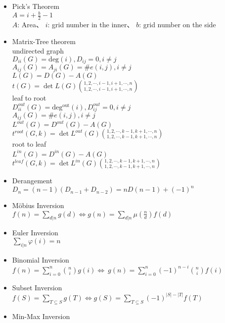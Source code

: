 \begin{itemize}
\setlength\itemsep{0.3em}

  \item Pick’s Theorem\\
    $A = i + \frac{b}{2} - 1$\\
    $A$: Area、 $i$: grid number in the inner、 $b$: grid number on the side
  \item Matrix-Tree theorem\\
    undirected graph\\
    $D_{ii}(G) = \mathrm{deg}(i), D_{ij} = 0, i\neq j$\\  
    $A_{ij}(G)=A_{ji}(G)=\#e(i,j), i\neq j$\\
    $L(G) = D(G) - A(G)$\\
    $t(G) = \det L(G){1,2,\cdots,i-1,i+1,\cdots,n \choose 1,2,\cdots,i-1,i+1,\cdots,n}$\\
    leaf to root\\
    $D^{out}_{ii}(G) = \mathrm{deg^{out}}(i), D^{out}_{ij} = 0, i\neq j$\\
    $A_{ij}(G)=\#e(i,j), i\neq j$\\
    $L^{out}(G) = D^{out}(G) - A(G)$\\
    $t^{root}(G, k) = \det L^{out}(G){1,2,\cdots,k-1,k+1,\cdots,n \choose 1,2,\cdots,k-1,k+1,\cdots,n}$\\
    root to leaf\\
    $L^{in}(G) = D^{in}(G) - A(G)$\\
    $t^{leaf}(G, k) = \det L^{in}(G){1,2,\cdots,k-1,k+1,\cdots,n \choose 1,2,\cdots,k-1,k+1,\cdots,n}$
  \item Derangement\\
    $D_n=(n-1)(D_{n-1}+D_{n-2})=nD(n-1)+(-1)^n$
  \item Möbius Inversion\\
    $f(n)=\sum\limits_{d|n}g(d) \Leftrightarrow g(n)=\sum\limits_{d|n}\mu(\frac{n}{d})f(d)$
  \item Euler Inversion\\
    $\sum\limits_{i|n} \varphi(i)=n$
  \item Binomial Inversion\\
    $f(n)=\sum\limits_{i=0}^n{n \choose i}g(i) \Leftrightarrow
  \ g(n)=\sum\limits_{i=0}^n(-1)^{n-i}{n \choose i}f(i)$
  \item Subset Inversion\\
      $f(S)=\sum_{T\subseteq S}g(T) \Leftrightarrow g(S)=\sum_{T\subseteq S}(-1)^{|S|-|T|}f(T)$
  \item Min-Max Inversion\\

\end{itemize}
